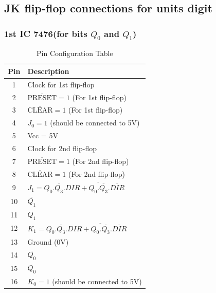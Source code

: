\documentclass[a4paper,12pt]{article}
\begin{document}
\subsection{JK flip-flop connections for units digit}
\subsubsection{1st IC 7476(for bits $Q_0$ and $Q_1$)}
\begin{table}[H]
    \centering
    \renewcommand{\arraystretch}{1.3} %
    \begin{tabular}{|c|l|}
        \hline
        \textbf{Pin} & \textbf{Description} \\ 
        \hline
        1  & Clock for 1st flip-flop \\ 
        2  & $\overline{\text{PRESET}} = 1$ (For 1st flip-flop) \\ 
        3  & $\overline{\text{CLEAR}} = 1$ (For 1st flip-flop) \\ 
        4  & $J_0 = 1$ (should be connected to 5V) \\ 
        5  & Vcc = 5V \\ 
        6  & Clock for 2nd flip-flop \\ 
        7  & $\overline{\text{PRESET}} = 1$ (For 2nd flip-flop) \\ 
        8  & $\overline{\text{CLEAR}} = 1$ (For 2nd flip-flop) \\ 
        9  & $J_1 = Q_0.\overline{Q_3}.DIR+\overline{Q_0.\overline{Q_3}}.\overline{DIR}$ \\ 
        10 & $\overline{Q_1}$ \\ 
        11 & $Q_1$ \\ 
        12 & $K_1 = Q_0.\overline{Q_3}.DIR+\overline{Q_0.\overline{Q_3}}.\overline{DIR}$ \\ 
        13 & Ground (0V) \\ 
        14 & $\overline{Q_0}$ \\ 
        15 & $Q_0$ \\ 
        16 & $K_0 = 1$ (should be connected to 5V) \\ 
        \hline
    \end{tabular}
    \caption{Pin Configuration Table}
    \label{tab:pin_config_1}
\end{table}
\end{document}
